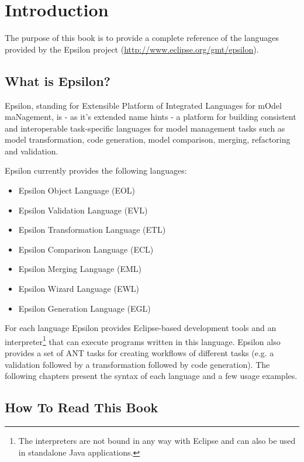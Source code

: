 \chapter{Introduction}
\label{chp:Introduction}

The purpose of this book is to provide a complete reference of the languages provided by the Epsilon project (\url{http://www.eclipse.org/gmt/epsilon}).

\section{What is Epsilon?}

Epsilon, standing for Extensible Platform of Integrated Languages for mOdel maNagement, is - as it's extended name hints - a platform for building consistent and interoperable task-specific languages for model management tasks such as model transformation, code generation, model comparison, merging, refactoring and validation.

Epsilon currently provides the following languages:

\begin{itemize}
	\item Epsilon Object Language (EOL)
	\item Epsilon Validation Language (EVL)
	\item Epsilon Transformation Language (ETL)
	\item Epsilon Comparison Language (ECL)
	\item Epsilon Merging Language (EML)
	\item Epsilon Wizard Language (EWL)
	\item Epsilon Generation Language (EGL)
\end{itemize}

For each language Epsilon provides Eclipse-based development tools and an interpreter\footnote{The interpreters are not bound in any way with Eclipse and can also be used in standalone Java applications.} that can execute programs written in this language. Epsilon also provides a set of ANT tasks for creating workflows of different tasks (e.g. a validation followed by a transformation followed by code generation). The following chapters present the syntax of each language and a few usage examples.

\section{How To Read This Book}

